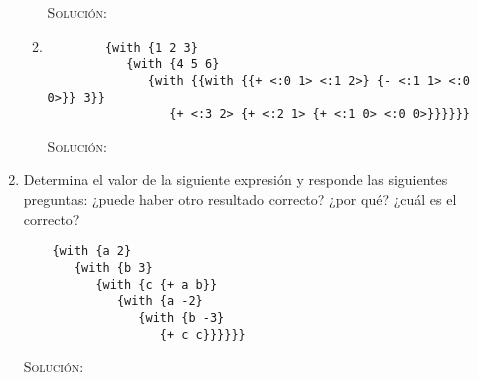 \documentclass[letterpaper,11pt]{article}
\begin{document}
\begin{enumerate}
\begin{enumerate}
        \textsc{Solución:}

        \item 
        \begin{verbatim}
        {with {1 2 3} 
           {with {4 5 6} 
              {with {{with {{+ <:0 1> <:1 2>} {- <:1 1> <:0 0>}} 3}} 
                 {+ <:3 2> {+ <:2 1> {+ <:1 0> <:0 0>}}}}}}
        \end{verbatim}

        \textsc{Solución:}
    \end{enumerate}

    \item Determina el valor de la siguiente expresión y responde las siguientes 
    preguntas: ¿puede haber otro resultado correcto? ¿por qué? ¿cuál es el 
    correcto? 
    \begin{verbatim}
    {with {a 2} 
       {with {b 3} 
          {with {c {+ a b}} 
             {with {a -2} 
                {with {b -3} 
                   {+ c c}}}}}}
    \end{verbatim}

    \textsc{Solución:}
\end{enumerate}
\end{document}
